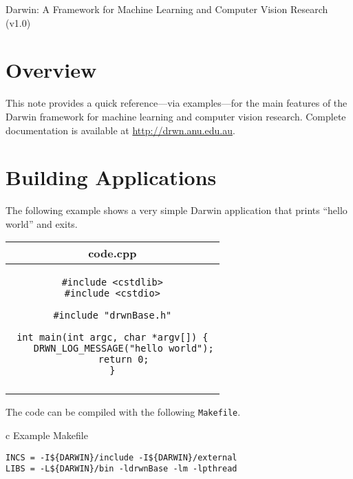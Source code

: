 \documentclass[landscape,8pt]{article}
\newcommand{\thickhline}{\noalign{\hrule height 0.8pt}}
\begin{document}

\begin{center}
  \Large
  {\sc Darwin}: A Framework for Machine Learning and Computer Vision Research (v1.0)
\end{center}

\small
\begin{multicols}{3}


\section*{Overview}

This note provides a quick reference---via examples---for the main
features of the {\sc Darwin} framework for machine learning and
computer vision research. Complete documentation is available at
\url{http://drwn.anu.edu.au}.


\section*{Building Applications}

The following example shows a very simple {\sc Darwin} application
that prints ``hello world'' and exits.

\begin{tabular}{c}
\thickhline
{\sc code.cpp}\\
\hline
\begin{minipage}[h]{0.95\columnwidth}
\smallskip
\begin{verbatim}
#include <cstdlib>
#include <cstdio>

#include "drwnBase.h"

int main(int argc, char *argv[]) {
    DRWN_LOG_MESSAGE("hello world");
    return 0;
}
\end{verbatim}
\smallskip
\end{minipage}\\
\thickhline
\end{tabular}

The code can be compiled with the following \texttt{Makefile}.

\begin{tabular}{c}
\thickhline
{\sc Example Makefile}\\
\hline
\begin{minipage}[h]{0.95\columnwidth}
\smallskip
\begin{verbatim}
INCS = -I${DARWIN}/include -I${DARWIN}/external
LIBS = -L${DARWIN}/bin -ldrwnBase -lm -lpthread


\end{verbatim}
\end{minipage}
\end{tabular}
\end{multicols}
\end{document}
